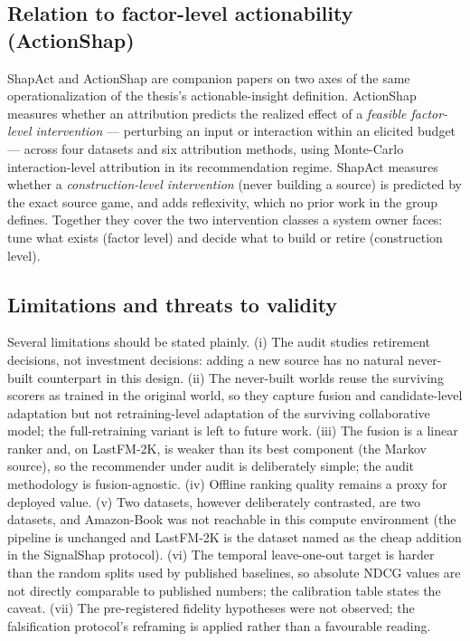 \documentclass[pdflatex,sn-mathphys-num]{sn-jnl}
\theoremstyle{thmstyleone}%
\theoremstyle{thmstyletwo}%
\theoremstyle{thmstylethree}%
\begin{document}
\subsection{Relation to factor-level actionability (ActionShap)}\label{subsec5_2}

ShapAct and ActionShap \cite{louhichi2026actionshap} are companion papers on two axes of the same operationalization of the thesis's actionable-insight definition. ActionShap measures whether an attribution predicts the realized effect of a \emph{feasible factor-level intervention} --- perturbing an input or interaction within an elicited budget --- across four datasets and six attribution methods, using Monte-Carlo interaction-level attribution in its recommendation regime. ShapAct measures whether a \emph{construction-level intervention} (never building a source) is predicted by the exact source game, and adds reflexivity, which no prior work in the group defines. Together they cover the two intervention classes a system owner faces: tune what exists (factor level) and decide what to build or retire (construction level).

\subsection{Limitations and threats to validity}\label{subsec5_3}

Several limitations should be stated plainly. (i) The audit studies retirement decisions, not investment decisions: adding a new source has no natural never-built counterpart in this design. (ii) The never-built worlds reuse the surviving scorers as trained in the original world, so they capture fusion and candidate-level adaptation but not retraining-level adaptation of the surviving collaborative model; the full-retraining variant is left to future work. (iii) The fusion is a linear ranker and, on LastFM-2K, is weaker than its best component (the Markov source), so the recommender under audit is deliberately simple; the audit methodology is fusion-agnostic. (iv) Offline ranking quality remains a proxy for deployed value. (v) Two datasets, however deliberately contrasted, are two datasets, and Amazon-Book was not reachable in this compute environment (the pipeline is unchanged and LastFM-2K is the dataset named as the cheap addition in the SignalShap protocol). (vi) The temporal leave-one-out target is harder than the random splits used by published baselines, so absolute NDCG values are not directly comparable to published numbers; the calibration table states the caveat. (vii) The pre-registered fidelity hypotheses were not observed; the falsification protocol's reframing is applied rather than a favourable reading.
\end{document}
